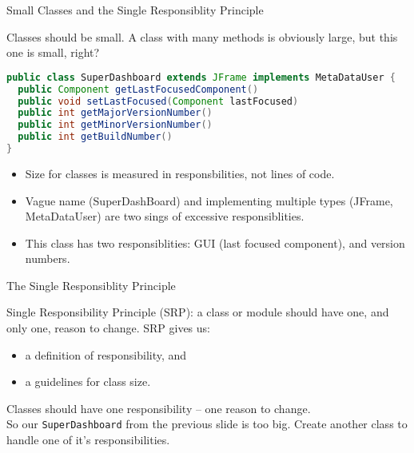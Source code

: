 \documentclass{beamer}
\begin{document}
\begin{frame}[fragile]{Small Classes and the Single Responsiblity Principle}


Classes should be small.  A class with many methods is obviously large, but this one is small, right?
\begin{lstlisting}[language=Java]
public class SuperDashboard extends JFrame implements MetaDataUser {
  public Component getLastFocusedComponent()
  public void setLastFocused(Component lastFocused)
  public int getMajorVersionNumber()
  public int getMinorVersionNumber()
  public int getBuildNumber()
}
\end{lstlisting}

\begin{itemize}
\item Size for classes is measured in responsbilities, not lines of code.
\item Vague name (SuperDashBoard) and implementing multiple types (JFrame, MetaDataUser) are two sings of excessive responsiblities.
\item This class has two responsiblities: GUI (last focused component), and version numbers.
\end{itemize}

\end{frame}

\begin{frame}[fragile]{The Single Responsiblity Principle}


Single Responsibility Principle (SRP): a class or module should have one, and only one, reason to change. SRP gives us:
\begin{itemize}
\item a definition of responsibility, and
\item a guidelines for class size.
\end{itemize}
Classes should have one responsibility -- one reason to change.\\
\vspace{.1in}
So our {\tt SuperDashboard} from the previous slide is too big.  Create another class to handle one of it's responsibilities.
\end{frame}
\end{document}
